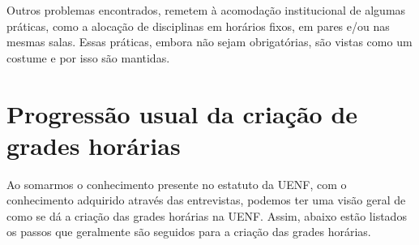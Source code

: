         Outros problemas encontrados, remetem à acomodação institucional de algumas práticas, como a alocação de disciplinas em horários fixos, em pares e/ou nas mesmas salas. Essas práticas, embora não sejam obrigatórias, são vistas como um costume e por isso são mantidas.

\section{Progressão usual da criação de grades horárias} %


    Ao somarmos o conhecimento presente no estatuto da UENF, com o conhecimento adquirido através das entrevistas, podemos ter uma visão geral de como se dá a criação das grades horárias na UENF. Assim, abaixo estão listados os passos que geralmente são seguidos para a criação das grades horárias.


